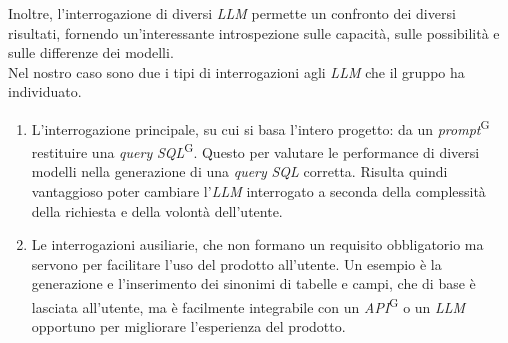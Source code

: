 \documentclass[5pt]{article}
\begin{document}
			Inoltre, l'interrogazione di diversi \textit{LLM} permette un confronto dei diversi risultati, fornendo un'interessante introspezione sulle capacità, sulle possibilità e sulle differenze dei modelli. \\
			
			Nel nostro caso sono due i tipi di interrogazioni agli \textit{LLM} che il gruppo ha individuato.
			\begin{enumerate}
				\item L'interrogazione principale, su cui si basa l'intero progetto: da un \textit{prompt}\textsuperscript{G} restituire una \textit{query} \textit{SQL}\textsuperscript{G}. 
				Questo per valutare le performance di diversi modelli nella generazione di una \textit{query} \textit{SQL} corretta. 
				Risulta quindi vantaggioso poter cambiare l'\textit{LLM} interrogato a seconda della complessità della richiesta e della volontà dell'utente. 
				
				\item Le interrogazioni ausiliarie, che non formano un requisito obbligatorio ma servono per facilitare l'uso del prodotto all'utente. 
					Un esempio è la generazione e l'inserimento dei sinonimi di tabelle e campi, che di base è lasciata all'utente, 
					ma è facilmente integrabile con un \textit{API}\textsuperscript{G} o un \textit{LLM} opportuno per migliorare l'esperienza del prodotto.
			\end{enumerate}
	
\end{document}
